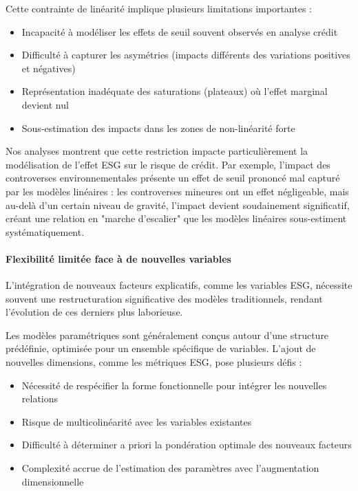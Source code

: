 Cette contrainte de linéarité implique plusieurs limitations importantes :
\begin{itemize}
    \item Incapacité à modéliser les effets de seuil souvent observés en analyse crédit
    \item Difficulté à capturer les asymétries (impacts différents des variations positives et négatives)
    \item Représentation inadéquate des saturations (plateaux) où l'effet marginal devient nul
    \item Sous-estimation des impacts dans les zones de non-linéarité forte
\end{itemize}

Nos analyses montrent que cette restriction impacte particulièrement la modélisation de l'effet ESG sur le risque de crédit. Par exemple, l'impact des controverses environnementales présente un effet de seuil prononcé mal capturé par les modèles linéaires : les controverses mineures ont un effet négligeable, mais au-delà d'un certain niveau de gravité, l'impact devient soudainement significatif, créant une relation en "marche d'escalier" que les modèles linéaires sous-estiment systématiquement.

\paragraph{Flexibilité limitée face à de nouvelles variables}

L'intégration de nouveaux facteurs explicatifs, comme les variables ESG, nécessite souvent une restructuration significative des modèles traditionnels, rendant l'évolution de ces derniers plus laborieuse.

Les modèles paramétriques sont généralement conçus autour d'une structure prédéfinie, optimisée pour un ensemble spécifique de variables. L'ajout de nouvelles dimensions, comme les métriques ESG, pose plusieurs défis :
\begin{itemize}
    \item Nécessité de respécifier la forme fonctionnelle pour intégrer les nouvelles relations
    \item Risque de multicolinéarité avec les variables existantes
    \item Difficulté à déterminer a priori la pondération optimale des nouveaux facteurs
    \item Complexité accrue de l'estimation des paramètres avec l'augmentation dimensionnelle
\end{itemize}

